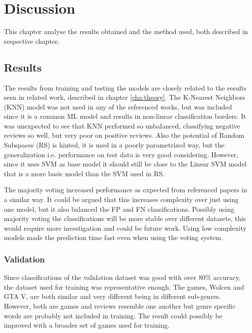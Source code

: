 \chapter{Discussion}
\label{cha:discussion}


This chapter analyse the results obtained and the method used, both described in respective chapter.


\section{Results}
\label{sec:discussion-results}


The results from training and testing the models are closely related to the results seen in related work, described in chapter \autoref{cha:theory}. 
The K-Nearest Neighbors (KNN) model was not used in any of the referenced works, but was included since it is a common ML model and results in non-linear classification borders. 
It was unexpected to see that KNN performed so unbalanced, classifying negative reviews so well, but very poor on positive reviews. 
Also the potential of Random Subspaces (RS) is hinted, it is used in a poorly parametrized way, but the generalization i.e. performance on test data is very good considering. 
However, since it uses SVM as base model it should still be close to the Linear SVM model that is a more basic model than the SVM used in RS. 


The majority voting increased performance as expected from referenced papers in a similar way. 
It could be argued that this increases complexity over just using one model, but it also balanced the FP and FN classifications. 
Possibly using majority voting the classifications will be more stable over different datasets, this would require more investigation and could be future work. 
Using low complexity models made the prediction time fast even when using the voting system.


\subsection{Validation}
\label{sec:discussion-validation}


Since classifications of the validation dataset was good with over 80\% accuracy, the dataset used for training was representative enough. 
The games, Wolcen and GTA V, are both similar and very different being in different sub-genres. 
However, both are games and reviews resemble one another but genre specific words are probably not included in training. 
The result could possibly be improved with a broader set of games used for training. 


